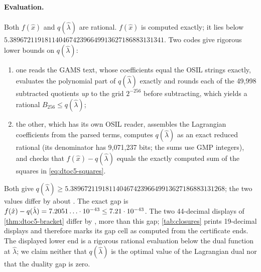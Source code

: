 \paragraph{Evaluation.}
Both $f(\hat x)$ and $q(\hat\lambda)$ are rational.
$f(\hat x)$ is computed exactly; it lies below $5.38967211918114046742396649913627186883131341$.
Two codes give rigorous lower bounds on $q(\hat\lambda)$:
\begin{enumerate}
\item[(i)] one reads the GAMS text, whose coefficients equal the OSIL strings exactly, evaluates the polynomial part of $q(\hat\lambda)$ exactly and rounds each of the 49,998 subtracted quotients \emph{up} to the grid $2^{-256}$ before subtracting, which yields a rational $B_{256}\le q(\hat\lambda)$;
\item[(ii)] the other, which has its own OSIL reader, assembles the Lagrangian coefficients from the parsed terms, computes $q(\hat\lambda)$ as an exact reduced rational (its denominator has 9,071,237 bits; the sums use GMP integers), and checks that $f(\hat x)-q(\hat\lambda)$ equals the exactly computed sum of the squares in \eqref{eq:dtoc5-squares}.
\end{enumerate}
Both give $q(\hat\lambda)\ge5.38967211918114046742396649913627186883131268$; the two values differ by about .
The exact gap is $f(\hat x)-q(\hat\lambda)=7.2051\ldots\cdot10^{-43}\le7.21\cdot 10^{-43}$.
The two 44-decimal displays of \cref{thm:dtoc5-bracket} differ by , more than this gap; \cref{tab:closures} prints 19-decimal displays and therefore marks its gap cell as computed from the certificate ends.
The displayed lower end is a rigorous rational evaluation below the dual function at $\hat\lambda$; we claim neither that $q(\hat\lambda)$ is the optimal value of the Lagrangian dual nor that the duality gap is zero.

\begin{certbox}
\end{certbox}

